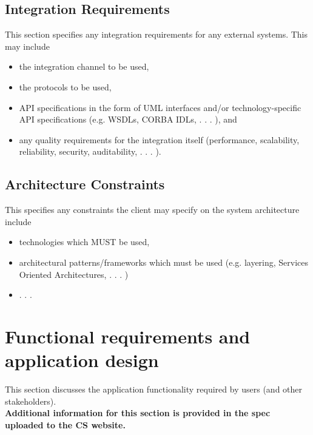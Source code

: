\documentclass[a4paper,12pt]{article}
\begin{document}
\subsection{Integration Requirements}

This section specifies any integration requirements for any external systems. This may include
\begin{itemize}
\item the integration channel to be used,
\item the protocols to be used,
\item API specifications in the form of UML interfaces and/or technology-specific API specifications (e.g. WSDLs, CORBA IDLs, . . . ), and
\item any quality requirements for the integration itself (performance, scalability, reliability, security, auditability, . . . ).
\end{itemize}

\subsection{Architecture Constraints}

This specifies any constraints the client may specify on the system architecture include
\begin{itemize}
\item technologies which MUST be used,
\item architectural patterns/frameworks which must be used (e.g. layering, Services Oriented Architectures, . . . )
\item . . .
\end{itemize}

\section{Functional requirements and application design}
This section discusses the application functionality required by users (and other stakeholders).\\
\textbf{Additional information for this section is provided in the spec uploaded to the CS website.}
\end{document}
